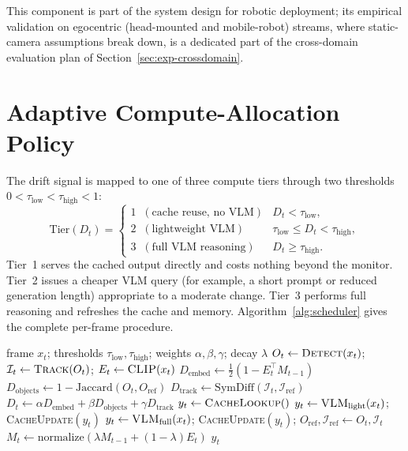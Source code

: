 This component is part of the system design for robotic deployment; its
empirical validation on egocentric (head-mounted and mobile-robot) streams,
where static-camera assumptions break down, is a dedicated part of the
cross-domain evaluation plan of Section~\ref{sec:exp-crossdomain}.

\section{Adaptive Compute-Allocation Policy}
\label{sec:meth-policy}

The drift signal is mapped to one of three compute tiers through two
thresholds $0 < \tau_{\text{low}} < \tau_{\text{high}} < 1$:
\begin{equation}
  \text{Tier}(D_t) =
  \begin{cases}
    1 \;\; (\text{cache reuse, no VLM}) & D_t < \tau_{\text{low}},\\[2pt]
    2 \;\; (\text{lightweight VLM}) & \tau_{\text{low}} \le D_t < \tau_{\text{high}},\\[2pt]
    3 \;\; (\text{full VLM reasoning}) & D_t \ge \tau_{\text{high}}.
  \end{cases}
  \label{eq:policy}
\end{equation}
Tier~1 serves the cached output directly and costs nothing beyond the monitor.
Tier~2 issues a cheaper VLM query (for example, a short prompt or reduced
generation length) appropriate to a moderate change. Tier~3 performs full
reasoning and refreshes the cache and memory. Algorithm~\ref{alg:scheduler}
gives the complete per-frame procedure.

\begin{algorithm}[htbp]
\caption{Semantic-aware per-frame compute allocation}
\label{alg:scheduler}
\begin{algorithmic}[1]
\Require frame $x_t$; thresholds $\tau_{\text{low}},\tau_{\text{high}}$;
         weights $\alpha,\beta,\gamma$; decay $\lambda$
\State $O_t \gets \textsc{Detect}(x_t)$;\quad
       $\mathcal{I}_t \gets \textsc{Track}(O_t)$;\quad
       $E_t \gets \textsc{CLIP}(x_t)$
\State $D_{\text{embed}} \gets \tfrac{1}{2}(1 - E_t^{\!\top} M_{t-1})$
\State $D_{\text{objects}} \gets 1 - \text{Jaccard}(O_t, O_{\text{ref}})$
\State $D_{\text{track}} \gets \text{SymDiff}(\mathcal{I}_t, \mathcal{I}_{\text{ref}})$
\State $D_t \gets \alpha D_{\text{embed}} + \beta D_{\text{objects}} + \gamma D_{\text{track}}$
  \State $y_t \gets \textsc{CacheLookup}()$ 
  \State $y_t \gets \textsc{VLM}_{\text{light}}(x_t)$;\;
         \textsc{CacheUpdate}$(y_t)$ 
\Else
  \State $y_t \gets \textsc{VLM}_{\text{full}}(x_t)$;\;
         \textsc{CacheUpdate}$(y_t)$;\;
         $O_{\text{ref}},\mathcal{I}_{\text{ref}} \gets O_t,\mathcal{I}_t$ 
\EndIf
\State $M_t \gets \text{normalize}(\lambda M_{t-1} + (1-\lambda) E_t)$
\State \Return $y_t$
\end{algorithmic}
\end{algorithm}

